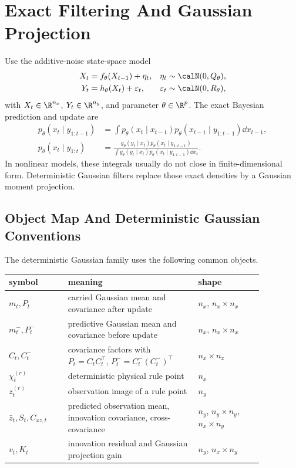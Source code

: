 \section{Exact Filtering And Gaussian Projection}
\label{sec:bf-hd-gq-exact-filtering}

Use the additive-noise state-space model
\begin{align}
  X_t &= f_\theta(X_{t-1})+\eta_t,
  &
  \eta_t&\sim\calN(0,Q_\theta),
  \label{eq:bf-hd-gq-state-model}\\
  Y_t &= h_\theta(X_t)+\varepsilon_t,
  &
  \varepsilon_t&\sim\calN(0,R_\theta),
  \label{eq:bf-hd-gq-observation-model}
\end{align}
with \(X_t\in\R^{n_x}\), \(Y_t\in\R^{n_y}\), and parameter
\(\theta\in\R^p\).  The exact Bayesian prediction and update are
\begin{align}
  p_\theta(x_t\mid y_{1:t-1})
  &=
  \int p_\theta(x_t\mid x_{t-1})
       p_\theta(x_{t-1}\mid y_{1:t-1})\dd x_{t-1},
  \label{eq:bf-hd-gq-exact-prediction}\\
  p_\theta(x_t\mid y_{1:t})
  &=
  \frac{
  g_\theta(y_t\mid x_t)
  p_\theta(x_t\mid y_{1:t-1})}
  {\int g_\theta(y_t\mid x_t)
  p_\theta(x_t\mid y_{1:t-1})\dd x_t}.
  \label{eq:bf-hd-gq-exact-update}
\end{align}
In nonlinear models, these integrals usually do not close in finite-dimensional
form.  Deterministic Gaussian filters replace those exact densities by a Gaussian
moment projection.

\subsection{Object Map And Deterministic Gaussian Conventions}
\label{subsec:bf-hd-gq-object-map}

The deterministic Gaussian family uses the following common objects.
\begin{center}
\small
\begin{tabular}{p{0.20\linewidth}p{0.44\linewidth}p{0.22\linewidth}}
\toprule
symbol & meaning & shape \\
\midrule
\(m_t,P_t\) & carried Gaussian mean and covariance after update & \(n_x\), \(n_x\times n_x\) \\
\(m_t^-,P_t^-\) & predictive Gaussian mean and covariance before update & \(n_x\), \(n_x\times n_x\) \\
\(C_t,C_t^-\) & covariance factors with \(P_t=C_tC_t^\top\), \(P_t^-=C_t^-(C_t^-)^\top\) & \(n_x\times n_x\) \\
\(\chi_t^{(r)}\) & deterministic physical rule point & \(n_x\) \\
\(z_t^{(r)}\) & observation image of a rule point & \(n_y\) \\
\(\bar z_t,S_t,C_{xz,t}\) & predicted observation mean, innovation covariance, cross-covariance & \(n_y\), \(n_y\times n_y\), \(n_x\times n_y\) \\
\(v_t,K_t\) & innovation residual and Gaussian projection gain & \(n_y\), \(n_x\times n_y\) \\
\bottomrule
\end{tabular}
\end{center}

